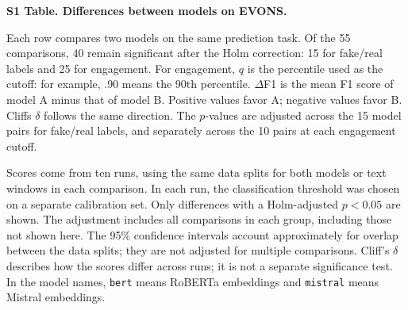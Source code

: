 \documentclass[10pt,letterpaper]{article}
\begin{document}
{\large\bfseries S1 Table. Differences between models on EVONS.}\par\medskip
Each row compares two models on the same prediction task. Of the 55 comparisons, 40 remain significant after the Holm correction: 15 for fake/real labels and 25 for engagement. For engagement, $q$ is the percentile used as the cutoff: for example, .90 means the 90th percentile. $\Delta$F1 is the mean F1 score of model A minus that of model B. Positive values favor A; negative values favor B. Cliff\textquotesingle s $\delta$ follows the same direction. The $p$-values are adjusted across the 15 model pairs for fake/real labels, and separately across the 10 pairs at each engagement cutoff.\par\smallskip
Scores come from ten runs, using the same data splits for both models or text windows in each comparison. In each run, the classification threshold was chosen on a separate calibration set. Only differences with a Holm-adjusted $p<0.05$ are shown. The adjustment includes all comparisons in each group, including those not shown here. The 95\% confidence intervals account approximately for overlap between the data splits; they are not adjusted for multiple comparisons. Cliff's $\delta$ describes how the scores differ across runs; it is not a separate significance test. In the model names, \texttt{bert} means RoBERTa embeddings and \texttt{mistral} means Mistral embeddings.\par\medskip
\small
\end{document}
